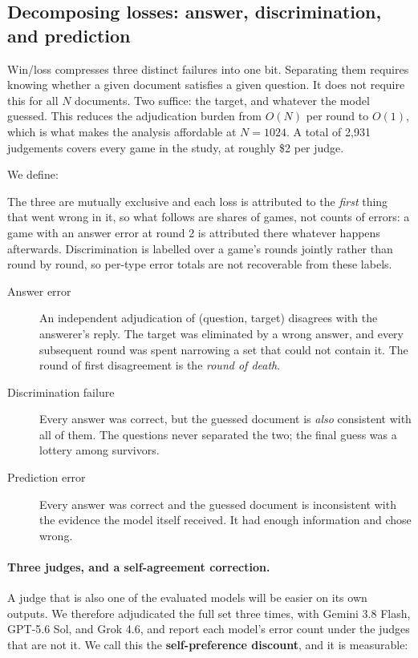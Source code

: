 \documentclass[11pt]{article}
\begin{document}
\subsection{Decomposing losses: answer, discrimination, and prediction}
\label{sec:errors}

Win/loss compresses three distinct failures into one bit. Separating them
requires knowing whether a given document satisfies a given question. It does
not require this for all $N$ documents. Two suffice: the target, and whatever
the model guessed. This reduces the adjudication burden from $O(N)$ per round
to $O(1)$, which is what makes the analysis affordable at $N{=}1024$. A total of 2{,}931
judgements covers every game in the study, at roughly \$2 per judge.

We define:

The three are mutually exclusive and each loss is attributed to the
\emph{first} thing that went wrong in it, so what follows are shares of games,
not counts of errors: a game with an answer error at round 2 is attributed there
whatever happens afterwards. Discrimination is labelled over a game's rounds
jointly rather than round by round, so per-type error totals are not recoverable
from these labels.

\begin{description}
\item[Answer error] An independent adjudication of (question, target)
disagrees with the answerer's reply. The target was eliminated by a wrong
answer, and every subsequent round was spent narrowing a set that could not
contain it. The round of first disagreement is the \emph{round of death}.
\item[Discrimination failure] Every answer was correct, but the guessed
document is \emph{also} consistent with all of them. The questions never
separated the two; the final guess was a lottery among survivors.
\item[Prediction error] Every answer was correct and the guessed document is
inconsistent with the evidence the model itself received. It had enough
information and chose wrong.
\end{description}

\paragraph{Three judges, and a self-agreement correction.} A judge that is also
one of the evaluated models will be easier on its own outputs. We therefore
adjudicated the full set three times, with Gemini 3.8 Flash, GPT-5.6 Sol, and
Grok 4.6, and report each model's error count under the judges that are not it.
We call this the \textbf{self-preference discount}, and it is measurable:
\end{document}
